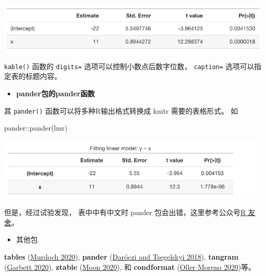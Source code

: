 \documentclass[
]{book}
\newenvironment{Shaded}{\begin{snugshade}}{\end{snugshade}}
\newcommand{\NormalTok}[1]{#1}
\providecommand{\tightlist}{%
  \setlength{\itemsep}{0pt}\setlength{\parskip}{0pt}}
\begin{document}
\includegraphics{images/paste-7647DCE8.png}

\texttt{kable()} 函数的 \texttt{digits=} 选项可以控制小数点后数字位数， \texttt{caption=}
选项可以指定表的标题内容。

\begin{itemize}
\tightlist
\item
  \textbf{pander包的pander函数}
\end{itemize}

其 \texttt{pander()} 函数可以将多种R输出格式转换成 knitr 需要的表格形式。 如

\begin{Shaded}
\begin{Highlighting}[]
\NormalTok{pander::pander(lmr)}
\end{Highlighting}
\end{Shaded}

\includegraphics{images/paste-20A9EA07.png}

但是，经过试验发现， 表中中有中文时 pander 包会出错，这里参考公众号\href{https://mp.weixin.qq.com/s/MKvRoyCyEHqHNzC9DRfVWQ}{R
友舍}。

\begin{itemize}
\tightlist
\item
  其他包
\end{itemize}

\textbf{tables} (\href{https://bookdown.org/yihui/rmarkdown-cookbook/table-other.html\#ref-R-tables}{Murdoch
2020}),
\textbf{pander} (\href{https://bookdown.org/yihui/rmarkdown-cookbook/table-other.html\#ref-R-pander}{Daróczi and Tsegelskyi
2018}),
\textbf{tangram} (\href{https://bookdown.org/yihui/rmarkdown-cookbook/table-other.html\#ref-R-tangram}{Garbett
2020}),
\textbf{ztable} (\href{https://bookdown.org/yihui/rmarkdown-cookbook/table-other.html\#ref-R-ztable}{Moon
2020}),
和 \textbf{condformat} (\href{https://bookdown.org/yihui/rmarkdown-cookbook/table-other.html\#ref-R-condformat}{Oller Moreno
2020})等。
\end{document}
